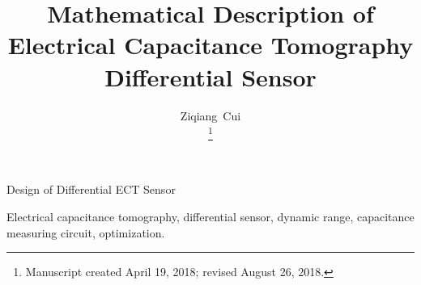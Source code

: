 \documentclass[journal]{IEEEtran}
\begin{document}
%
\title{Mathematical Description of  Electrical Capacitance Tomography Differential Sensor}
%
%
%

\author{Ziqiang~Cui

\thanks{Manuscript created April 19, 2018; revised August 26, 2018.}}



%
{Design of Differential ECT Sensor}

\maketitle



\begin{IEEEkeywords}
Electrical capacitance tomography, differential sensor, dynamic range, capacitance measuring circuit, optimization.
\end{IEEEkeywords}



















\end{document}
